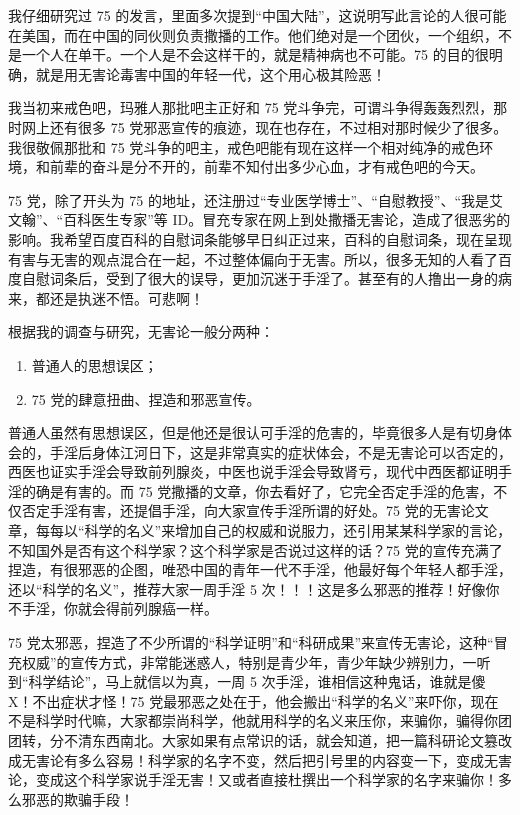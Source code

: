 我仔细研究过 75 的发言，里面多次提到“中国大陆”，这说明写此言论的人很可能在美国，而在中国的同伙则负责撒播的工作。他们绝对是一个团伙，一个组织，不是一个人在单干。一个人是不会这样干的，就是精神病也不可能。75 的目的很明确，就是用无害论毒害中国的年轻一代，这个用心极其险恶！

我当初来戒色吧，玛雅人那批吧主正好和 75 党斗争完，可谓斗争得轰轰烈烈，那时网上还有很多 75 党邪恶宣传的痕迹，现在也存在，不过相对那时候少了很多。我很敬佩那批和 75 党斗争的吧主，戒色吧能有现在这样一个相对纯净的戒色环境，和前辈的奋斗是分不开的，前辈不知付出多少心血，才有戒色吧的今天。

75 党，除了开头为 75 的地址，还注册过“专业医学博士”、“自慰教授”、“我是艾文翰”、“百科医生专家”等 ID。冒充专家在网上到处撒播无害论，造成了很恶劣的影响。我希望百度百科的自慰词条能够早日纠正过来，百科的自慰词条，现在呈现有害与无害的观点混合在一起，不过整体偏向于无害。所以，很多无知的人看了百度自慰词条后，受到了很大的误导，更加沉迷于手淫了。甚至有的人撸出一身的病来，都还是执迷不悟。可悲啊！

根据我的调查与研究，无害论一般分两种：

\begin{enumerate}
    \item 普通人的思想误区；
    \item 75 党的肆意扭曲、捏造和邪恶宣传。
\end{enumerate}

普通人虽然有思想误区，但是他还是很认可手淫的危害的，毕竟很多人是有切身体会的，手淫后身体江河日下，这是非常真实的症状体会，不是无害论可以否定的，西医也证实手淫会导致前列腺炎，中医也说手淫会导致肾亏，现代中西医都证明手淫的确是有害的。而 75 党撒播的文章，你去看好了，它完全否定手淫的危害，不仅否定手淫有害，还提倡手淫，向大家宣传手淫所谓的好处。75 党的无害论文章，每每以“科学的名义”来增加自己的权威和说服力，还引用某某科学家的言论，不知国外是否有这个科学家？这个科学家是否说过这样的话？75 党的宣传充满了捏造，有很邪恶的企图，唯恐中国的青年一代不手淫，他最好每个年轻人都手淫，还以“科学的名义”，推荐大家一周手淫 5 次！！！这是多么邪恶的推荐！好像你不手淫，你就会得前列腺癌一样。

75 党太邪恶，捏造了不少所谓的“科学证明”和“科研成果”来宣传无害论，这种“冒充权威”的宣传方式，非常能迷惑人，特别是青少年，青少年缺少辨别力，一听到“科学结论”，马上就信以为真，一周 5 次手淫，谁相信这种鬼话，谁就是傻 X！不出症状才怪！75 党最邪恶之处在于，他会搬出“科学的名义”来吓你，现在不是科学时代嘛，大家都崇尚科学，他就用科学的名义来压你，来骗你，骗得你团团转，分不清东西南北。大家如果有点常识的话，就会知道，把一篇科研论文篡改成无害论有多么容易！科学家的名字不变，然后把引号里的内容变一下，变成无害论，变成这个科学家说手淫无害！又或者直接杜撰出一个科学家的名字来骗你！多么邪恶的欺骗手段！

